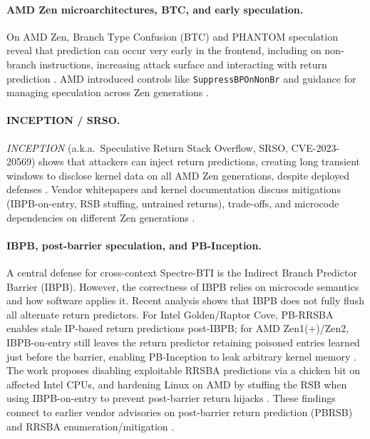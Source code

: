 \documentclass[11pt,a4paper]{article}
\begin{document}
\paragraph{AMD Zen microarchitectures, BTC, and early speculation.}
On AMD Zen, Branch Type Confusion (BTC) and PHANTOM speculation reveal that prediction can occur very early in the frontend, including on non-branch instructions, increasing attack surface and interacting with return prediction \cite{amd2022btc,wikner2023phantom}. AMD introduced controls like \texttt{SuppressBPOnNonBr} and guidance for managing speculation across Zen generations \cite{amd2022btc,amd_software_spec}.

\paragraph{INCEPTION / SRSO.}
\emph{INCEPTION} (a.k.a.\ Speculative Return Stack Overflow, SRSO, CVE-2023-20569) shows that attackers can inject return predictions, creating long transient windows to disclose kernel data on all AMD Zen generations, despite deployed defenses \cite{trujillo2023inception,nvd_cve_2023_20569,amd_sb7005,linux_srso_doc}. Vendor whitepapers and kernel documentation discuss mitigations (IBPB-on-entry, RSB stuffing, untrained returns), trade-offs, and microcode dependencies on different Zen generations \cite{amd_srso_whitepaper,linux_srso_doc}.

\paragraph{IBPB, post-barrier speculation, and PB-Inception.}
A central defense for cross-context Spectre-BTI is the Indirect Branch Predictor Barrier (IBPB). However, the correctness of IBPB relies on microcode semantics and how software applies it. Recent analysis shows that IBPB does not fully flush all alternate return predictors. For Intel Golden/Raptor Cove, PB-RRSBA enables stale IP-based return predictions post-IBPB; for AMD Zen1(+)/Zen2, IBPB-on-entry still leaves the return predictor retaining poisoned entries learned just before the barrier, enabling PB-Inception to leak arbitrary kernel memory \cite{wikner2025breaking}. The work proposes disabling exploitable RRSBA predictions via a chicken bit on affected Intel CPUs, and hardening Linux on AMD by stuffing the RSB when using IBPB-on-entry to prevent post-barrier return hijacks \cite{wikner2025breaking}. These findings connect to earlier vendor advisories on post-barrier return prediction (PBRSB) and RRSBA enumeration/mitigation \cite{intel_pbrsb,intel_rrsba}.
\end{document}
